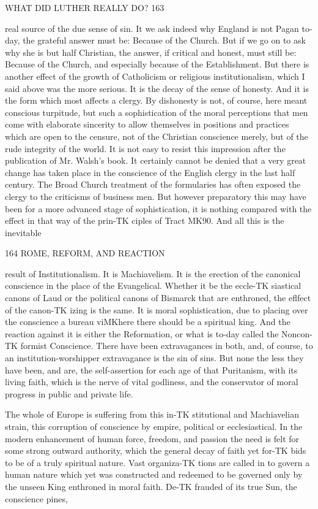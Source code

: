 \documentclass[12pt,a5paper,twoside]{book}
\begin{document}
{WHAT DID LUTHER REALLY DO? 163 

real source of the due sense of sin. It we ask indeed 
why England is not Pagan to-day, the grateful answer 
must be: Because of the Church. But if we go on 
to ask why she is but half Christian, the answer, if 
critical and honest, must still be: Because of the 
Church, and especially because of the Establishment. 
But there is another effect of the growth of 
Catholicism or religious institutionalism, which I 
said above was the more serious. It is the decay of 
the sense of honesty. And it is the form which 
most affects a clergy. By dishonesty is not, of 
course, here meant conscious turpitude, but such a 
sophistication of the moral perceptions that men 
come with elaborate sincerity to allow themselves in 
positions and practices which are open to the censure, 
not of the Christian conscience merely, but of the 
rude integrity of the world. It is not easy to resist 
this impression after the publication of Mr. Walsh's 
book. It certainly cannot be denied that a very 
great change has taken place in the conscience of 
the English clergy in the last half century. The 
Broad Church treatment of the formularies has often 
exposed the clergy to the criticisms of business men. 
But however preparatory this may have been for a 
more advanced stage of sophistication, it is nothing 
compared with the effect in that way of the prin-TK
ciples of Tract MK90. And all this is the inevitable 



164 ROME, REFORM, AND REACTION 

result of Institutionalism. It is Machiavelism. It 
is the erection of the canonical conscience in the 
place of the Evangelical. Whether it be the eccle-TK
siastical canons of Laud or the political canons of 
Bismarck that are enthroned, the eflfect of the canon-TK
izing is the same. It is moral sophistication, due to 
placing over the conscience a bureau viMKhere there should 
be a spiritual king. And the reaction against it is either 
the Reformation, or what is to-day called the Noncon-TK
formist Conscience. There have been extravagances 
in both, and, of course, to an institution-worshipper 
extravagance is the sin of sins. But none the less 
they have been, and are, the self-assertion for each 
age of that Puritanism, with its living faith, which 
is the nerve of vital godliness, and the conservator 
of moral progress in public and private life. 

The whole of Europe is suffering from this in-TK
stitutional and Machiavelian strain, this corruption 
of conscience by empire, political or ecclesiastical. 
In the modern enhancement of human force, freedom, 
and passion the need is felt for some strong outward 
authority, which the general decay of faith yet for-TK
bids to be of a truly spiritual nature. Vast organiza-TK
tions are called in to govern a human nature which yet 
was constructed and redeemed to be governed only by 
the unseen King enthroned in moral faith. De-TK
frauded of its true Sun, the conscience pines, 



}
\end{document}
